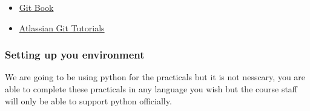 \documentclass{csse4400}
\begin{document}
\begin{itemize}
  \item \href{https://git-scm.com/book/en/v2}{Git Book}
  \item \href{https://www.atlassian.com/git/tutorials}{Atlassian Git Tutorials}
\end{itemize}


\subsubsection{Setting up you environment}

We are going to be using python for the practicals but it is not nesscary, you are able to complete these practicals in any language you wish but the course staff will only be able to support python officially.
\end{document}
